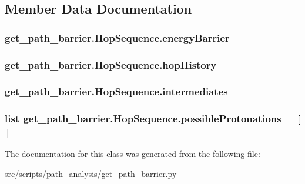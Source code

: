 \subsection{Member Data Documentation}
\hypertarget{classget__path__barrier_1_1_hop_sequence_a0bcfd627eb7a3a1adbcea611d1e4b6a6}{
\subsubsection[{energy\-Barrier}]{\setlength{\rightskip}{0pt plus 5cm}get\-\_\-path\-\_\-barrier.\-Hop\-Sequence.\-energy\-Barrier}}\label{classget__path__barrier_1_1_hop_sequence_a0bcfd627eb7a3a1adbcea611d1e4b6a6}
\hypertarget{classget__path__barrier_1_1_hop_sequence_a579cbd71947f980116542947f6fc3bb3}{
\subsubsection[{hop\-History}]{\setlength{\rightskip}{0pt plus 5cm}get\-\_\-path\-\_\-barrier.\-Hop\-Sequence.\-hop\-History}}\label{classget__path__barrier_1_1_hop_sequence_a579cbd71947f980116542947f6fc3bb3}
\hypertarget{classget__path__barrier_1_1_hop_sequence_aa539256b485b15e0bfb1388e832c4060}{
\subsubsection[{intermediates}]{\setlength{\rightskip}{0pt plus 5cm}get\-\_\-path\-\_\-barrier.\-Hop\-Sequence.\-intermediates}}\label{classget__path__barrier_1_1_hop_sequence_aa539256b485b15e0bfb1388e832c4060}
\hypertarget{classget__path__barrier_1_1_hop_sequence_a1ddfff32b9b3d13841eaf9fcaceba041}{
\subsubsection[{possible\-Protonations}]{\setlength{\rightskip}{0pt plus 5cm}list get\-\_\-path\-\_\-barrier.\-Hop\-Sequence.\-possible\-Protonations = \mbox{[}$\,$\mbox{]}\hspace{0.3cm}{\ttfamily [static]}}}\label{classget__path__barrier_1_1_hop_sequence_a1ddfff32b9b3d13841eaf9fcaceba041}


The documentation for this class was generated from the following file\-:\begin{DoxyCompactItemize}
\item 
src/scripts/path\-\_\-analysis/\hyperlink{get__path__barrier_8py}{get\-\_\-path\-\_\-barrier.\-py}\end{DoxyCompactItemize}
